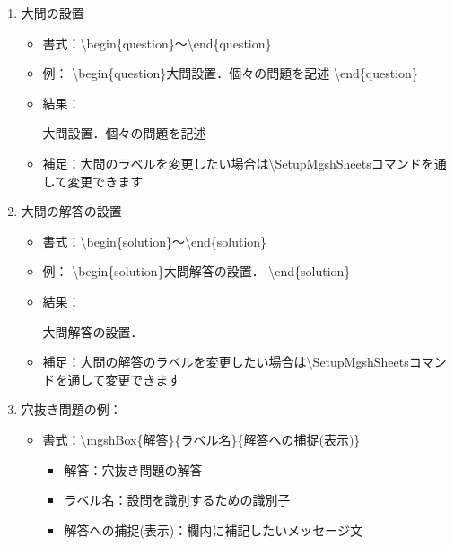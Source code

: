 \documentclass[10pt]{jarticle}
\begin{document}
\begin{enumerate}
  \item 大問の設置
    \begin{itemize}
      \item 書式：\textbackslash begin\{question\}〜\textbackslash end\{question\}
      \item 例：  \textbackslash begin\{question\}大問設置．個々の問題を記述 \textbackslash end\{question\} 
    \item 結果：\begin{screen}\begin{question}大問設置．個々の問題を記述 \end{question}\end{screen}
      \item 補足：大問のラベルを変更したい場合は\textbackslash SetupMgshSheetsコマンドを通して変更できます 
    \end{itemize}                                                                               
  \item 大問の解答の設置
    \begin{itemize}
      \item 書式：\textbackslash begin\{solution\}〜\textbackslash end\{solution\}
      \item 例：  \textbackslash begin\{solution\}大問解答の設置． \textbackslash end\{solution\} 
    \item 結果：\begin{screen}\begin{solution} 大問解答の設置． \end{solution} \end{screen}
      \item 補足：大問の解答のラベルを変更したい場合は\textbackslash SetupMgshSheetsコマンドを通して変更できます 
    \end{itemize}
  \item 穴抜き問題の例：
    \begin{itemize}
      \item 書式：\textbackslash mgshBox\{解答\}\{ラベル名\}\{解答への捕捉(表示)\}
        \begin{itemize}
          \item 解答：穴抜き問題の解答
          \item ラベル名：設問を識別するための識別子 
        \item 解答への捕捉(表示)：欄内に補記したいメッセージ文
      \end{itemize}

\end{itemize}
\end{enumerate}
\end{document}
